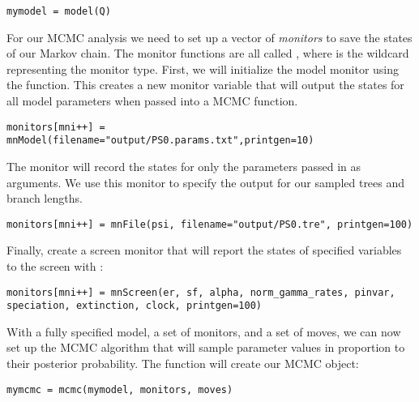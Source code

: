{\tt \begin{snugshade*}
\begin{lstlisting}
mymodel = model(Q)
\end{lstlisting}
\end{snugshade*}}

For our MCMC analysis we need to set up a vector of \textit{monitors} to save the states of our Markov chain. 
The monitor functions are all called , where \cl{*} is the wildcard representing the monitor type.
First, we will initialize the model monitor using the  function. This creates a new monitor variable that will output the states for all model parameters when passed into a MCMC function. 
{\tt \begin{snugshade*}
\begin{lstlisting}
monitors[mni++] = mnModel(filename="output/PS0.params.txt",printgen=10)
\end{lstlisting}
\end{snugshade*}}

The  monitor will record the states for only the parameters passed in as arguments. We use this monitor to specify the output for our sampled trees and branch lengths.

{\tt \begin{snugshade*}
\begin{lstlisting}
monitors[mni++] = mnFile(psi, filename="output/PS0.tre", printgen=100)
\end{lstlisting}
\end{snugshade*}}

Finally, create a screen monitor that will report the states of specified variables to the screen with :
{\tt \begin{snugshade*}
\begin{lstlisting}
monitors[mni++] = mnScreen(er, sf, alpha, norm_gamma_rates, pinvar, speciation, extinction, clock, printgen=100)
\end{lstlisting}
\end{snugshade*}}

With a fully specified model, a set of monitors, and a set of moves, we can now set up the MCMC algorithm that will sample parameter values in proportion to their posterior probability. The  function will create our MCMC object:
{\tt \begin{snugshade*}
\begin{lstlisting}
mymcmc = mcmc(mymodel, monitors, moves)
\end{lstlisting}
\end{snugshade*}}

